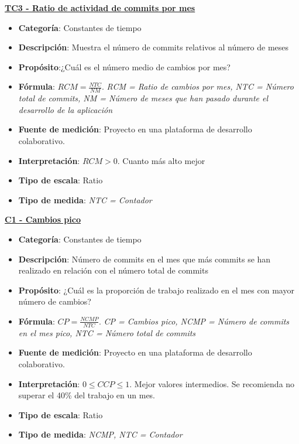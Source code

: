 \textbf{\underline{TC3 - Ratio de actividad de commits por mes}}
\begin{itemize}
	\tightlist
	\item \textbf{Categoría}: Constantes de tiempo
	\item \textbf{Descripción}: Muestra el número de commits relativos al número de meses
	\item \textbf{Propósito}:¿Cuál es el número medio de cambios por mes?
	\item \textbf{Fórmula}: $RCM = \frac{NTC}{NM}$. \textit{RCM = Ratio de cambios por mes, NTC = Número total de commits, NM = Número de meses que han pasado durante el desarrollo de la aplicación}
	\item \textbf{Fuente de medición}: Proyecto en una plataforma de desarrollo colaborativo.
	\item \textbf{Interpretación}: $RCM > 0$. Cuanto más alto mejor
	\item \textbf{Tipo de escala}: Ratio
	\item \textbf{Tipo de medida}: \textit{NTC = Contador}
\end{itemize}
\textbf{\underline{C1 - Cambios pico}}
\begin{itemize}
	\tightlist
	\item \textbf{Categoría}: Constantes de tiempo
	\item \textbf{Descripción}: Número de commits en el mes que más commits se han realizado en relación con el número total de commits
	\item \textbf{Propósito}: ¿Cuál es la proporción de trabajo realizado en el mes con mayor número de cambios?
	\item \textbf{Fórmula}: $CP = \frac{NCMP}{NTC}$. \textit{CP = Cambios pico, NCMP = Número de commits en el mes pico, NTC = Número total de commits}
	\item \textbf{Fuente de medición}: Proyecto en una plataforma de desarrollo colaborativo.
	\item \textbf{Interpretación}: $0 \leq CCP \leq 1$. Mejor valores intermedios. Se recomienda no superar el 40\% del trabajo en un mes.
	\item \textbf{Tipo de escala}: Ratio
	\item \textbf{Tipo de medida}: \textit{NCMP, NTC = Contador}
\end{itemize}

